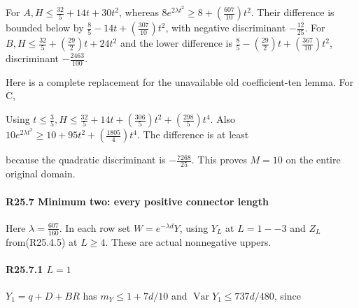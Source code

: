 For \(A,\allowbreak \allowbreak  H\le \frac{32}{5}+14t+30t^2\), whereas \(8e^{2\lambda t^2}\ge 8+(\frac{607}{10})t^2\). Their difference is bounded below by \(\frac{8}{5}-14t+(\frac{307}{10})t^2\), with negative discriminant \(-\frac{12}{25}\). For \(B,\allowbreak \allowbreak  H\le \frac{32}{5}+(\frac{29}{2})t+24t^2\) and the lower difference is \(\frac{8}{5}-(\frac{29}{2})t+(\frac{367}{10})t^2\), discriminant \(-\frac{2463}{100}\).

Here is a complete replacement for the unavailable old coefficient-ten lemma. For C,


Using \(t\le \frac{3}{5},\allowbreak \allowbreak  H\le \frac{32}{5}+14t+(\frac{306}{5})t^2+(\frac{298}{5})t^4\). Also \(10e^{2\lambda t^2}\ge 10+95t^2+(\frac{1805}{4})t^4\). The difference is at least


because the quadratic discriminant is \(-\frac{7268}{25}\). This proves \(M=10\) on the entire original domain. 

\paragraph{R25.7 Minimum two: every positive connector length}

Here \(\lambda=\frac{607}{160}\). In each row set \(W=e^{-\lambda d}Y\), using \(Y_L\) at \(L=1--3\) and \(Z_L\) from(R25.4.5) at \(L\ge 4\). These are actual nonnegative uppers.

\paragraph{R25.7.1 \(L=1\)}

\(Y_{1}=q+D+BR\) has \(m_Y\le 1+7d/10\) and \(\operatorname{Var}Y_{1}\le 737d/480\), since


